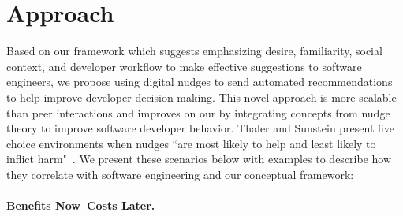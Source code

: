 
\section{Approach}

Based on our framework which suggests emphasizing desire, familiarity, social context, and developer workflow to make effective suggestions to software engineers, we propose using digital nudges to send automated recommendations to help improve developer decision-making. This novel approach is more scalable than peer interactions and improves on our \tele by integrating concepts from nudge theory to improve software developer behavior. Thaler and Sunstein present five choice environments when nudges ``are most likely to help and least likely to inflict harm"~\cite[p.~74]{sunstein2008nudge}. We present these scenarios below with examples to describe how they correlate with software engineering and our conceptual framework:

\paragraph{Benefits Now--Costs Later.}

